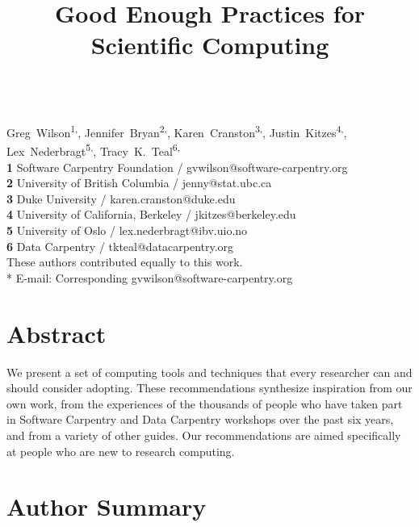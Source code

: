 \documentclass[10pt,letterpaper]{article}
\date{}
\begin{document}
\vspace*{0.2in}

\begin{flushleft}
{\Large
\textbf{}
}
\newline
\\
{Greg~Wilson}\textsuperscript{1,\ddag *},
{Jennifer~Bryan}\textsuperscript{2,\ddag},
{Karen~Cranston}\textsuperscript{3,\ddag},
{Justin~Kitzes}\textsuperscript{4,\ddag},
{Lex~Nederbragt}\textsuperscript{5,\ddag},
{Tracy~K.~Teal}\textsuperscript{6,\ddag}
\\
\textbf{1} Software Carpentry Foundation / gvwilson@software-carpentry.org
\\
\textbf{2} University of British Columbia / jenny@stat.ubc.ca
\\
\textbf{3} Duke University / karen.cranston@duke.edu
\\
\textbf{4} University of California, Berkeley / jkitzes@berkeley.edu
\\
\textbf{5} University of Oslo / lex.nederbragt@ibv.uio.no
\\
\textbf{6} Data Carpentry / tkteal@datacarpentry.org
\\
\bigskip
{\ddag} These authors contributed equally to this work.
\\
* E-mail: Corresponding gvwilson@software-carpentry.org

\end{flushleft}

\title{Good Enough Practices for Scientific Computing}

\section*{Abstract}

We present a set of computing tools and techniques that every
researcher can and should consider adopting.  These recommendations
synthesize inspiration from our own work, from the experiences of the
thousands of people who have taken part in Software Carpentry and Data
Carpentry workshops over the past six years, and from a variety of
other guides.  Our recommendations are aimed specifically at people
who are new to research computing.

\section*{Author Summary}
\end{document}
